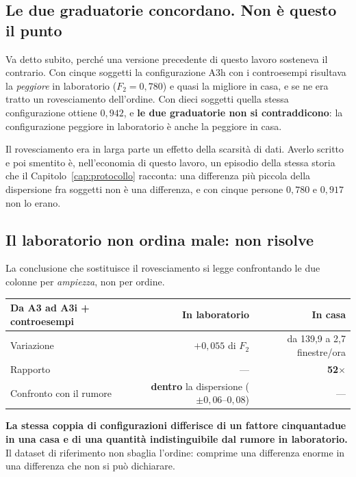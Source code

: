 \subsection{Le due graduatorie concordano. Non è questo il punto}

Va detto subito, perché una versione precedente di questo lavoro sosteneva il
contrario. Con cinque soggetti la configurazione A3h con i controesempi
risultava la \emph{peggiore} in laboratorio ($F_2 = 0{,}780$) e quasi la
migliore in casa, e se ne era tratto un rovesciamento dell'ordine. Con dieci
soggetti quella stessa configurazione ottiene $0{,}942$, e \textbf{le due
graduatorie non si contraddicono}: la configurazione peggiore in laboratorio è
anche la peggiore in casa.

Il rovesciamento era in larga parte un effetto della scarsità di dati. Averlo
scritto e poi smentito è, nell'economia di questo lavoro, un episodio della
stessa storia che il Capitolo~\ref{cap:protocollo} racconta: una differenza
più piccola della dispersione fra soggetti non è una differenza, e con cinque
persone $0{,}780$ e $0{,}917$ non lo erano.

\subsection{Il laboratorio non ordina male: non risolve}

La conclusione che sostituisce il rovesciamento si legge confrontando le due
colonne per \emph{ampiezza}, non per ordine.

\begin{center}
\begin{tabular}{lrr}
\toprule
Da A3 ad A3i + controesempi & In laboratorio & In casa \\
\midrule
Variazione & $+0{,}055$ di $F_2$ & da 139,9 a 2,7 finestre/ora \\
Rapporto & --- & \textbf{52$\times$} \\
Confronto con il rumore & \textbf{dentro} la dispersione ($\pm 0{,}06$--$0{,}08$) & --- \\
\bottomrule
\end{tabular}
\end{center}

\textbf{La stessa coppia di configurazioni differisce di un fattore
cinquantadue in una casa e di una quantità indistinguibile dal rumore in
laboratorio.} Il dataset di riferimento non sbaglia l'ordine: comprime una
differenza enorme in una differenza che non si può dichiarare.

